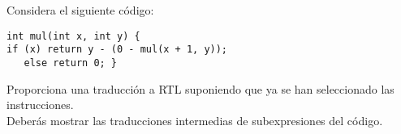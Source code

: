 Considera el siguiente c\'odigo:
\begin{verbatim}
int mul(int x, int y) {
if (x) return y - (0 - mul(x + 1, y)); 
   else return 0; }
\end{verbatim}
Proporciona una traducci\'on a RTL suponiendo que ya se han seleccionado 
las instrucciones. \\Deber\'as mostrar las traducciones intermedias de 
subexpresiones del c\'odigo.
